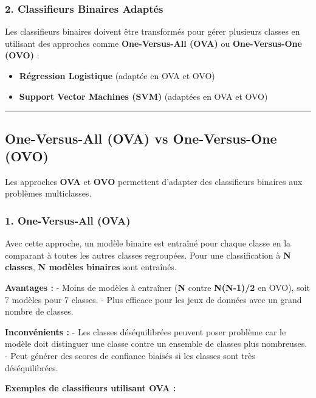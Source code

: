 \documentclass[
  letterpaper,
  DIV=11,
  numbers=noendperiod]{scrartcl}
\providecommand{\tightlist}{%
  \setlength{\itemsep}{0pt}\setlength{\parskip}{0pt}}\usepackage{longtable,booktabs,array}
\begin{document}
\subsubsection{2. Classifieurs Binaires
Adaptés}\label{classifieurs-binaires-adaptuxe9s}

Les classifieurs binaires doivent être transformés pour gérer plusieurs
classes en utilisant des approches comme \textbf{One-Versus-All (OVA)}
ou \textbf{One-Versus-One (OVO)} :

\begin{itemize}
\tightlist
\item
  \textbf{Régression Logistique} (adaptée en OVA et OVO)
\item
  \textbf{Support Vector Machines (SVM)} (adaptées en OVA et OVO)
\end{itemize}

\begin{center}\rule{0.5\linewidth}{0.5pt}\end{center}

\subsection{One-Versus-All (OVA) vs One-Versus-One
(OVO)}\label{one-versus-all-ova-vs-one-versus-one-ovo}

Les approches \textbf{OVA} et \textbf{OVO} permettent d'adapter des
classifieurs binaires aux problèmes multiclasses.

\subsubsection{1. One-Versus-All (OVA)}\label{one-versus-all-ova}

Avec cette approche, un modèle binaire est entraîné pour chaque classe
en la comparant à toutes les autres classes regroupées. Pour une
classification à \textbf{N classes}, \textbf{N modèles binaires} sont
entraînés.

\textbf{Avantages :} - Moins de modèles à entraîner (\textbf{N} contre
\textbf{N(N-1)/2} en OVO), soit 7 modèles pour 7 classes. - Plus
efficace pour les jeux de données avec un grand nombre de classes.

\textbf{Inconvénients :} - Les classes déséquilibrées peuvent poser
problème car le modèle doit distinguer une classe contre un ensemble de
classes plus nombreuses. - Peut générer des scores de confiance biaisés
si les classes sont très déséquilibrées.

\textbf{Exemples de classifieurs utilisant OVA :}
\end{document}
